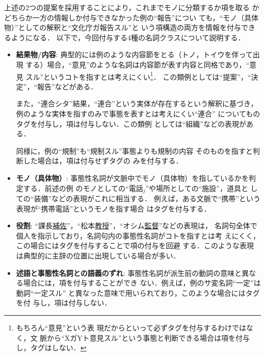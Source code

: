 \documentclass[japanese]{jnlp_1.4}
\def\brace#1{}
\begin{document}
上述の2つの提案を採用することにより，これまでモノに分類するか項を取る
かどちらか一方の情報しか付与できなかった例の``報告''につい
ても，``\nobreak モノ（具体物）''としての解釈と``文化庁ガ報告スル''と
いう項構造の両方を情報を付与できるようになる．
以下で，今回付与する4種の名詞クラスについて説明する．

\begin{itemize}

\item \textbf{結果物/内容}: 
典型的には例のような内容節をとる（トノ，トイウを伴って出現
する）場合，``意見''のような名詞は内容節が表す内容と同格であり，``意見
スル''というコトを指すとは考えにくい\footnote{もちろん``意見''という表
  現だからといって必ず\brace{結果物/内容}タグを付与するわけではなく，文
  脈から``XガYト意見スル''という事態と判断できる場合は項を付与
  し，\brace{結果物/内容}タグはしない．}．
この類例としては``提案''，``決定''，``報告''などがある．


また，``連合シタ''結果，``連合''という実体が存在するという解釈に基づき，
例のような実体を指すのみで事態を表すとは考えにくい``連合''
についても\brace{結果物/内容}のタグを付与し，項は付与しない．この類例
としては``組織''などの表現がある．

同様に，例の``規制''も``規制スル''事態よりも規制の内容
そのものを指すと判断した場合は，項は付与せず\brace{結果物/内容}タグの
みを付与する．

\item \textbf{モノ（具体物）}:
事態性名詞が文脈中でモノ（具体物）を指しているかを判定する．前述の例
のモノとしての``電話$_j$''や場所としての``施設''，道具と
しての``装備''などの表現がこれに相当する．
例えば，ある文脈で``携帯''という表現が``携帯電話''というモノを指す場合
は\brace {\nobreak モノ}タグを付与する．

\item \textbf{役割}:
``課長\ul{補佐}''，``松本\ul{教授}''，``オシム\ul{監督}''などの表現は，
名詞句全体で個人を指示しており，名詞句内の事態性名詞がコトを指すとは考
えにくく，この場合には\brace{\nobreak 役割}タグを付与することで項の付与を回避
する．このような表現は典型的に主辞の位置に出現している場合が多い．

\item \textbf{述語と事態性名詞との語義のずれ}:
事態性名詞が派生前の動詞の意味と異なる場合には，項を付与することができ
ない．例えば，例のサ変名詞``\nobreak 一定''は動詞``一定スル''
と異なった意味で用いられており，このような場合には\brace{ずれ}タグを付
与し，項は付与しない．

\end{itemize}
\end{document}
